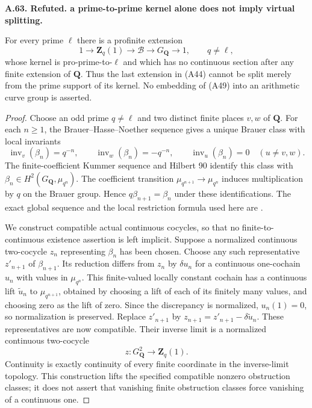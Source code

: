 \documentclass[11pt,oneside]{article}
\makeatletter
\newcounter{statementanchor}
\newenvironment{statement}[3]{%
 \refstepcounter{statementanchor}\def\@currentlabel{#1}%
 \par\addvspace{9pt}\noindent
 \textbf{#1. #2. #3.}\par\nobreak\noindent\ignorespaces
}{\par\addvspace{5pt}}
\makeatother
\begin{document}
\begin{statement}{A.63}{Refuted}{a prime-to-prime kernel alone does not imply virtual splitting}
\label{st:A.63}
\label{A:prime-complement-counterexample}
For every prime $\ell$ there is a profinite extension
\[
 1\longrightarrow\mathbf Z_q(1)\longrightarrow
 \mathcal B\longrightarrow G_{\mathbf Q}
       \longrightarrow1,
       \qquad q\ne\ell,
                                                        \tag{A49}
\]
whose kernel is pro-prime-to-$\ell$ and which has
no continuous section after any finite extension
of $\mathbf Q$. Thus the last extension in (A44)
cannot be split merely from the prime support
of its kernel. No embedding of (A49) into an
arithmetic curve group is asserted.
\end{statement}
\begin{proof}
Choose an odd prime $q\ne\ell$ and two distinct
finite places $v,w$ of $\mathbf Q$.
For each $n\ge1$, the Brauer--Hasse--Noether
sequence gives a unique Brauer class with local
invariants
\[
 \operatorname{inv}_v(\beta_n)=q^{-n},\qquad
 \operatorname{inv}_w(\beta_n)=-q^{-n},\qquad
 \operatorname{inv}_u(\beta_n)=0\quad(u\ne v,w).
                                                        \tag{A50}
\]
The finite-coefficient Kummer sequence and Hilbert
90 identify this class with
$\beta_n\in H^2(G_{\mathbf Q},\mu_{q^n})$.
The coefficient transition
$\mu_{q^{n+1}}\to\mu_{q^n}$ induces multiplication
by $q$ on the Brauer group. Hence
$q\beta_{n+1}=\beta_n$ under these identifications.
The exact global sequence and the local
restriction formula used here are
\cite[IV, 2.14(e); III, (29)]{A_MilneCFT}.

We construct compatible actual continuous
cocycles, so that no finite-to-continuous
existence assertion is left implicit.
Suppose a normalized continuous two-cocycle
$z_n$ representing $\beta_n$ has been chosen.
Choose any such representative $z'_{n+1}$
of $\beta_{n+1}$. Its reduction differs from
$z_n$ by $\delta u_n$ for a continuous
one-cochain $u_n$ with values in $\mu_{q^n}$.
This finite-valued locally constant cochain
has a continuous lift $\widetilde u_n$ to
$\mu_{q^{n+1}}$, obtained by choosing a lift
of each of its finitely many values, and choosing
zero as the lift of zero. Since the discrepancy
is normalized, $u_n(1)=0$, so normalization
is preserved.
Replace $z'_{n+1}$ by
$z_{n+1}=z'_{n+1}-\delta\widetilde u_n$.
These representatives are now compatible.
Their inverse limit is a normalized continuous
two-cocycle
\[
 z:G_{\mathbf Q}^2\longrightarrow\mathbf Z_q(1).
\]
Continuity is exactly continuity of every
finite coordinate in the inverse-limit
topology. This construction lifts the specified
compatible nonzero obstruction classes; it does
not assert that vanishing finite obstruction
classes force vanishing of a continuous one.


\end{proof}
\end{document}
